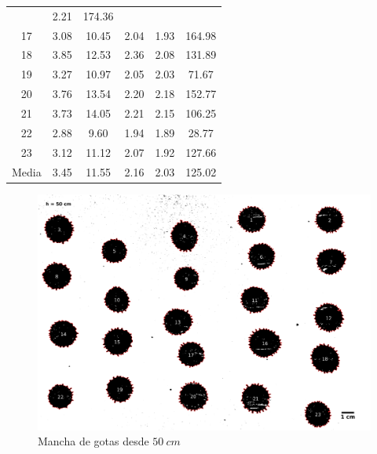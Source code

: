 \begin{table}[H]
\begin{tabular}{cccccc}
             & 2.21 & 174.36 \\ 17 & 3.08 & 10.45 & 2.04 & 1.93 & 164.98 \\ 18
             & 3.85 & 12.53 & 2.36 & 2.08 & 131.89 \\ 19 & 3.27 & 10.97 & 2.05
             & 2.03 & 71.67  \\ 20 & 3.76 & 13.54 & 2.20 & 2.18 & 152.77 \\ 21
             & 3.73 & 14.05 & 2.21 & 2.15 & 106.25 \\ 22 & 2.88 & 9.60  & 1.94
             & 1.89 & 28.77  \\ 23 & 3.12 & 11.12 & 2.07 & 1.92 & 127.66 \\
    \midrule Media & 3.45 & 11.55 & 2.16 & 2.03 & 125.02 \\ \bottomrule
\end{tabular} \end{table}

\begin{figure}[H] \centering
\includegraphics[width=0.75\linewidth]{src/50-1.png} \caption{Mancha de gotas
desde $50\ cm$} \label{fig:50cm-1} \end{figure}

